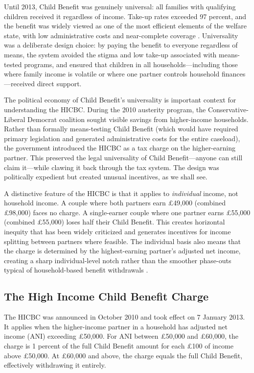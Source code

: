 \documentclass[12pt]{article}
\begin{document}
Until 2013, Child Benefit was genuinely universal: all families with qualifying children received it regardless of income. Take-up rates exceeded 97 percent, and the benefit was widely viewed as one of the most efficient elements of the welfare state, with low administrative costs and near-complete coverage \citep{browne2012}. Universality was a deliberate design choice: by paying the benefit to everyone regardless of means, the system avoided the stigma and low take-up associated with means-tested programs, and ensured that children in all households---including those where family income is volatile or where one partner controls household finances---received direct support.

The political economy of Child Benefit's universality is important context for understanding the HICBC. During the 2010 austerity program, the Conservative-Liberal Democrat coalition sought visible savings from higher-income households. Rather than formally means-testing Child Benefit (which would have required primary legislation and generated administrative costs for the entire caseload), the government introduced the HICBC as a tax charge on the higher-earning partner. This preserved the legal universality of Child Benefit---anyone can still claim it---while clawing it back through the tax system. The design was politically expedient but created unusual incentives, as we shall see.

A distinctive feature of the HICBC is that it applies to \emph{individual} income, not household income. A couple where both partners earn \pounds49,000 (combined \pounds98,000) faces no charge. A single-earner couple where one partner earns \pounds55,000 (combined \pounds55,000) loses half their Child Benefit. This creates horizontal inequity that has been widely criticized and generates incentives for income splitting between partners where feasible. The individual basis also means that the charge is determined by the highest-earning partner's adjusted net income, creating a sharp individual-level notch rather than the smoother phase-outs typical of household-based benefit withdrawals \citep{brewer2010}.

\subsection{The High Income Child Benefit Charge}

The HICBC was announced in October 2010 and took effect on 7 January 2013. It applies when the higher-income partner in a household has adjusted net income (ANI) exceeding \pounds50,000. For ANI between \pounds50,000 and \pounds60,000, the charge is 1 percent of the full Child Benefit amount for each \pounds100 of income above \pounds50,000. At \pounds60,000 and above, the charge equals the full Child Benefit, effectively withdrawing it entirely.
\end{document}
